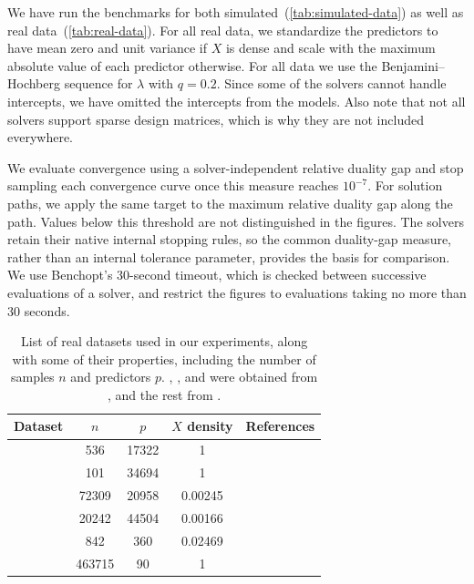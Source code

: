 \documentclass[a4paper,fleqn]{cas-sc}
\begin{document}
We have run the benchmarks for both simulated~(\autoref{tab:simulated-data}) as
well as real data~(\autoref{tab:real-data}). For all real data, we standardize
the predictors to have mean zero and unit variance if \(X\) is dense and scale
with the maximum absolute value of each predictor otherwise. For all data we use
the Benjamini--Hochberg sequence for \(\lambda\) with \(q = 0.2\). Since some of
the solvers cannot handle intercepts, we have omitted the intercepts from the
models. Also note that not all solvers support sparse design matrices, which is
why they are not included everywhere.

We evaluate convergence using a solver-independent relative duality gap and stop
sampling each convergence curve once this measure reaches \(10^{-7}\). For
solution paths, we apply the same target to the maximum relative duality gap
along the path. Values below this threshold are not distinguished in the
figures. The solvers retain their native internal stopping rules, so the common
duality-gap measure, rather than an internal tolerance parameter, provides the
basis for comparison. We use Benchopt's 30-second timeout, which is checked
between successive evaluations of a solver, and restrict the figures to
evaluations taking no more than 30 seconds.

\begin{table}[pos=htp]
  \caption{
    List of real datasets used in our experiments, along with some of their
    properties, including the number of samples \(n\) and predictors \(p\).
    , , and  were
    obtained from \citet{breheny2022}, and the rest from \citet{chang2016}.
  }
  \label{tab:real-data}
  \centering
  \begin{tabular}{
      l
      S[table-format=6.0]
      S[table-format=7.0]
      S[table-format=1.5,round-mode=figures,round-precision=2]
      p{0.48\textwidth}
    }
    \toprule
    Dataset                     & {\(n\)} & {\(p\)} & {\(X\) density} & {References}                        \\
    \midrule
                 & 536     & 17322   & 1               & \citet{nationalcancerinstitute2022} \\
      & 101     & 34694   & 1               & \citet{koussounadis2014}            \\
              & 72309   & 20958   & 0.00245         & \citet{mccallum2010}                \\
                  & 20242   & 44504   & 0.00166         & \citet{lewis2004}                   \\
              & 842     & 360     & 0.02469         & \citet{rhee2006}                    \\
     & 463715  & 90      & 1               & \citet{bertin-mahieux2011}          \\
    \bottomrule
  \end{tabular}
\end{table}
\end{document}
